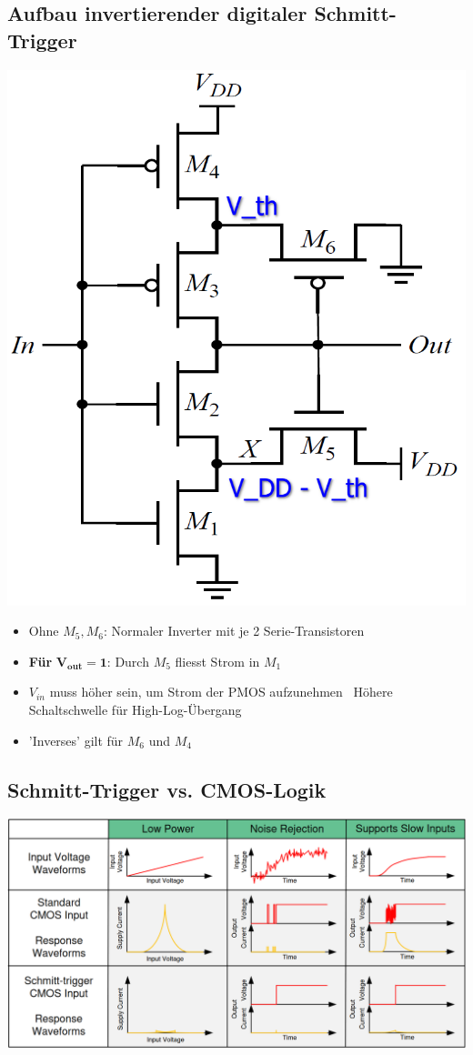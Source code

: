 \subsection{Aufbau invertierender digitaler Schmitt-Trigger}

\begin{minipage}[position]{0.3\columnwidth}
    \includegraphics[width=\columnwidth]{images/invertierender_schmitt-trigger.png}
\end{minipage}
\hfill
\begin{minipage}[position]{0.68\columnwidth}
    \begin{itemize}
        \item Ohne $M_5, M_6$: Normaler Inverter mit je 2 Serie-Transistoren
        \item \textbf{Für }$\boldsymbol{V_{out} = 1}$: Durch $M_5$ fliesst Strom in $M_1$
        \item $V_{in}$ muss höher sein, um Strom der PMOS aufzunehmen \textrightarrow\ Höhere Schaltschwelle für High-Log-Übergang
        \item 'Inverses' gilt für $M_6$ und $M_4$
    \end{itemize}
\end{minipage}


\subsection{Schmitt-Trigger vs. CMOS-Logik}

\includegraphics[width=\columnwidth]{images/benefits_schmitt-trigger.png}